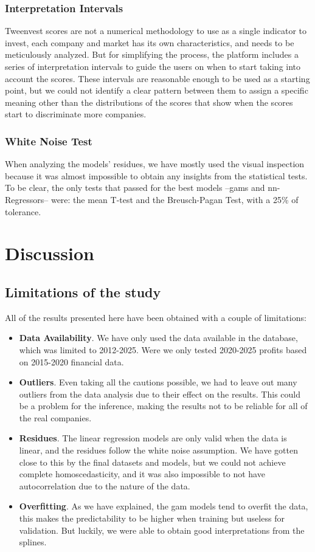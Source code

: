 \documentclass[11pt,english,a4paper,hidelinks]{book}
\begin{document}
\subsubsection{Interpretation Intervals}

\noindent Tweenvest scores are not a numerical methodology to use as a single indicator to invest, each company and market has its own characteristics, and needs to be meticulously analyzed. But for simplifying the process, the platform includes a series of interpretation intervals to guide the users on when to start taking into account the scores. These intervals are reasonable enough to be used as a starting point, but we could not identify a clear pattern between them to assign a specific meaning other than the distributions of the scores that show when the scores start to discriminate more companies.

\subsubsection{White Noise Test}

\noindent When analyzing the models' residues, we have mostly used the visual inspection because it was almost impossible to obtain any insights from the statistical tests. To be clear, the only tests that passed for the best models --\acrshort{gam}s and \acrshort{nn}-Regressors-- were: the mean T-test and the Breusch-Pagan Test, with a 25\% of tolerance.
\section{Discussion}

\subsection{Limitations of the study}
\noindent All of the results presented here have been obtained with a couple of limitations:
\begin{itemize}
    \item \textbf{Data Availability}. We have only used the data available in the database, which was limited to 2012-2025. Were we only tested 2020-2025 profits based on 2015-2020 financial data.
    \item \textbf{Outliers}. Even taking all the cautions possible, we had to leave out many outliers from the data analysis due to their effect on the results. This could be a problem for the inference, making the results not to be reliable for all of the real companies.
    \item \textbf{Residues}. The linear regression models are only valid when the data is linear, and the residues follow the white noise assumption. We have gotten close to this by the final datasets and models, but we could not achieve complete homoscedasticity, and it was also impossible to not have autocorrelation due to the nature of the data. 
    \item \textbf{Overfitting}. As we have explained, the \acrshort{gam} models tend to overfit the data, this makes the predictability to be higher when training but useless for validation. But luckily, we were able to obtain good interpretations from the splines.
\end{itemize}
\end{document}

